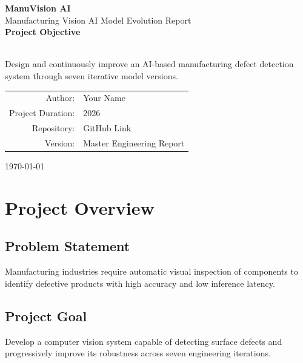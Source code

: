 \documentclass[12pt,a4paper]{report}
\begin{document}

\begin{titlepage}
\centering

\vspace*{2cm}

{\Huge \textbf{ManuVision AI}}\\[0.5cm]

{\Large Manufacturing Vision AI Model Evolution Report}\\[1cm]

\textbf{Project Objective}

\\[0.3cm]

Design and continuously improve an AI-based manufacturing defect detection system through seven iterative model versions.

\vfill

\begin{tabular}{rl}
Author: & Your Name \\
Project Duration: & 2026 \\
Repository: & GitHub Link \\
Version: & Master Engineering Report
\end{tabular}

\vfill

\today

\end{titlepage}

\tableofcontents
\listoffigures
\listoftables

\chapter{Project Overview}
%
\section{Problem Statement}

Manufacturing industries require automatic visual inspection of components to identify defective products with high accuracy and low inference latency.

\section{Project Goal}

Develop a computer vision system capable of detecting surface defects and progressively improve its robustness across seven engineering iterations.
\end{document}

